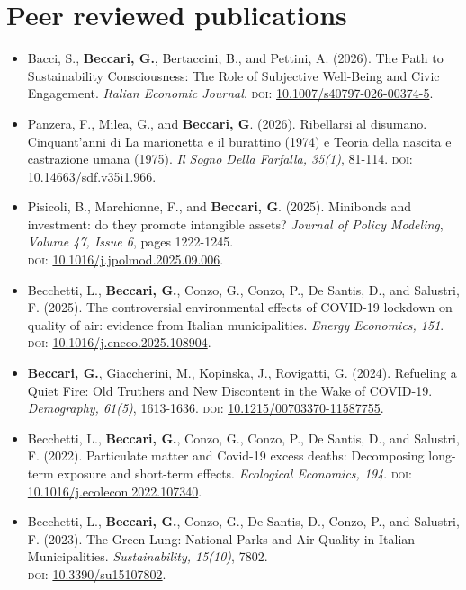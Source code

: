 \documentclass{article}
\begin{document}
\section*{Peer reviewed publications}
\begin{itemize}
	\item Bacci, S., \textbf{Beccari, G.}, Bertaccini, B., and Pettini, A. (2026). The Path to Sustainability Consciousness: The Role of Subjective Well-Being and Civic Engagement. \emph{Italian Economic Journal}. \textsc{doi}: \href{https://doi.org/10.1007/s40797-026-00374-5}{10.1007/s40797-026-00374-5}.
	\item Panzera, F., Milea, G., and \textbf{Beccari, G}. (2026). Ribellarsi al disumano. Cinquant'anni di La marionetta e il burattino (1974) e Teoria della nascita e castrazione umana (1975). \emph{Il Sogno Della Farfalla, 35(1)}, 81-114. \textsc{doi}: \href{https://doi.org/10.14663/sdf.v35i1.966}{10.14663/sdf.v35i1.966}.
	\item Pisicoli, B., Marchionne, F., and \textbf{Beccari, G}. (2025). Minibonds and investment: do they promote intangible assets? \emph{Journal of Policy Modeling}, \emph{Volume 47, Issue 6}, pages 1222-1245.\\ \textsc{doi}: \href{https://doi.org/10.1016/j.jpolmod.2025.09.006}{10.1016/j.jpolmod.2025.09.006}.
    \item Becchetti, L., \textbf{Beccari, G.}, Conzo, G., Conzo, P., De Santis, D., and Salustri, F. (2025). The controversial environmental effects of COVID-19 lockdown on quality of air: evidence from Italian municipalities. \emph{Energy Economics, 151}. \textsc{doi}: \href{https://doi.org/10.1016/j.eneco.2025.108904}{10.1016/j.eneco.2025.108904}.
    \item \textbf{Beccari, G.}, Giaccherini, M., Kopinska, J., Rovigatti, G. (2024). Refueling a Quiet Fire: Old Truthers and New Discontent in the Wake of {COVID-19}. \emph{Demography, 61(5)}, 1613-1636. \textsc{doi}: \href{https://doi.org/10.1215/00703370-11587755}{10.1215/00703370-11587755}.
    \item Becchetti, L., \textbf{Beccari, G.}, Conzo, G., Conzo, P., De Santis, D., and Salustri, F. (2022). Particulate matter and Covid-19 excess deaths: Decomposing long-term exposure and short-term effects. \emph{Ecological Economics, 194}. \textsc{doi}: \href{https://doi.org/10.1016/j.ecolecon.2022.107340}{10.1016/j.ecolecon.2022.107340}.
    \item Becchetti, L., \textbf{Beccari, G.}, Conzo, G., De Santis, D., Conzo, P., and Salustri, F. (2023). The Green Lung: National Parks and Air Quality in Italian Municipalities. \emph{Sustainability, 15(10)}, 7802.\\ \textsc{doi}: \href{https://doi.org/10.3390/su15107802}{10.3390/su15107802}.

\end{itemize}
\end{document}

